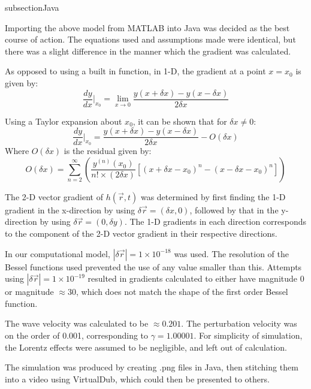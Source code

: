 subsection{Java}

Importing the above model from MATLAB into Java was decided as the best course of action. The equations used and assumptions made were identical, but there was a slight difference in the manner which the gradient was calculated.

As opposed to using a built in function, in 1-D, the gradient at a point $x = x_0$ is given by:
\begin{equation} \frac{dy}{dx}\Bigr|_{x_0} = \lim_{x\to0} \frac{y(x+\delta x)-y(x-\delta x)}{2\delta x}\end{equation}

Using a Taylor expansion about $x_0$, it can be shown that for $\delta x\neq 0$:
\begin{equation} \frac{dy}{dx}\Bigr|_{x_0} = \frac{y(x+\delta x) - y(x-\delta x)}{2\delta x} - O(\delta x)\end{equation}
Where $O(\delta x)$ is the residual given by:
\begin{equation}O(\delta x) = \sum_{n=2}^{\infty} \left( \frac{y^{(n)}(x_0)}{n!\times (2\delta x)} \left[ \left( x+\delta x -x_0 \right)^n - \left(x-\delta x -x_0 \right)^n \right] \right)\end{equation}

The 2-D vector gradient of $h(\vec{r} , t)$ was determined by first finding the 1-D gradient in the x-direction by using $\delta \vec{r} = (\delta x,0)$, followed by that in the y-direction by using $\delta \vec{r} = (0,\delta y)$. The 1-D gradients in each direction corresponds to the component of the 2-D vector gradient in their respective directions. 

In our computational model, $|\delta \vec{r}| = 1\times 10^{-18}$ was used. The resolution of the Bessel functions used prevented the use of any value smaller than this. Attempts using $|\delta \vec{r}| = 1\times 10^{-19}$ resulted in gradients calculated to either have magnitude 0 or magnitude $\approx 30$, which does not match the shape of the first order Bessel function.

The wave velocity was calculated to be $\approx 0.201$. The perturbation velocity was on the order of 0.001, corresponding to $\gamma = 1.00001$. For simplicity of simulation, the Lorentz effects were assumed to be negligible, and left out of calculation.

The simulation was produced by creating .png files in Java, then stitching them into a video using VirtualDub, which could then be presented to others.

